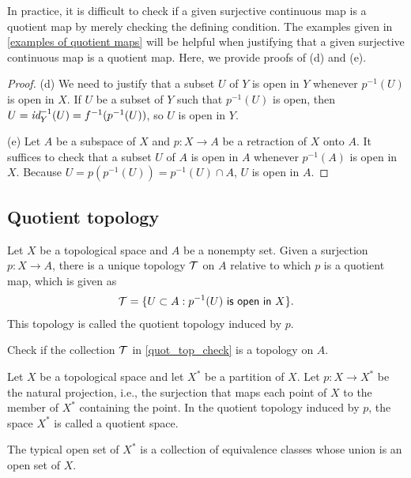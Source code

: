 In practice, it is difficult to check if a given surjective continuous map is a quotient map by merely checking the defining condition.
The examples given in \cref{examples of quotient maps} will be helpful when justifying that a given surjective continuous map is a quotient map.
Here, we provide proofs of (d) and (e).
\begin{proof}
    \hangindent=0.65cm

    \noindent(d)
    We need to justify that a subset $U$ of $Y$ is open in $Y$ whenever $p^{-1}(U)$ is open in $X$.
    If $U$ be a subset of $Y$ such that $p^{-1}(U)$ is open, then $U=\textit{id}_{Y}^{-1}(U)=f^{-1}(p^{-1}(U))$, so $U$ is open in $Y$.

    \noindent(e)
    Let $A$ be a subspace of $X$ and $p: X\rightarrow A$ be a retraction of $X$ onto $A$.
    It suffices to check that a subset $U$ of $A$ is open in $A$ whenever $p^{-1}(A)$ is open in $X$.
    Because $U=p(p^{-1}(U))=p^{-1}(U)\cap A$, $U$ is open in $A$.
\end{proof}

\subsection{Quotient topology}

\begin{defi}
    Let $X$ be a topological space and $A$ be a nonempty set.
    Given a surjection $p: X\rightarrow A$, there is a unique topology ${\mathcal{T}}$ on $A$ relative to which $p$ is a quotient map, which is given as
    \begin{align}\label{quot_top_check}
        {\mathcal{T}}=\{U\subset A: \textsf{$p^{-1}(U)$ is open in $X$}\}.
    \end{align}
    This topology is called the quotient topology induced by $p$.
\end{defi}
\begin{prob}
    Check if the collection ${\mathcal{T}}$ in \cref{quot_top_check} is a topology on $A$.
\end{prob}
\begin{defi}
    Let $X$ be a topological space and let $X^*$ be a partition of $X$.
    Let $p: X\rightarrow X^*$ be the natural projection, i.e., the surjection that maps each point of $X$ to the member of $X^*$ containing the point.
    In the quotient topology induced by $p$, the space $X^*$ is called a quotient space.
\end{defi}
\begin{rmk}
    The typical open set of $X^*$ is a collection of equivalence classes whose union is an open set of $X$.
\end{rmk}

